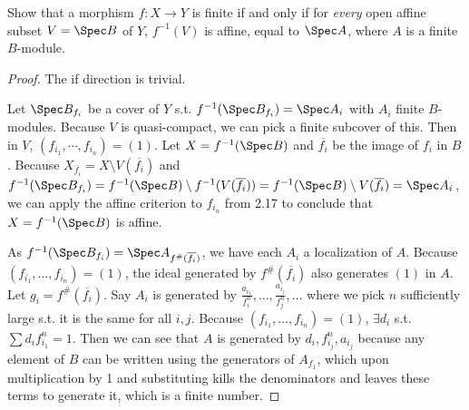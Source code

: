 \begin{exercise}%
	Show that a morphism $f: X\to Y $ is finite if and only if for \textit{every} open affine subset $V = \Spec B $ of $Y $, $f^{-1}(V) $ is affine, equal to $\Spec A $, where $A $ is a finite $B $-module.
\end{exercise}
\begin{proof}
	The if direction is trivial.

	Let $\Spec B_{f_i} $ be a cover of $Y $ s.t. $f^{-1}(\Spec B_{f_{i}}) = \Spec A_i $ with $A_i $ finite $B $-modules.
	Because $V $ is quasi-compact, we can pick a finite subcover of this.
	Then in $V $, $(f_{i_1},\cdots,f_{i_n}) = (1) $.
	Let $X = f^{-1}(\Spec B) $ and $\overline{f_i}  $ be the image of $f_i $ in $B $.
	Because $X_{\overline{f_i} } =  X \setminus V(\overline{f_i})$ and $f^{-1}(\Spec B_{f_{i}}) = f^{-1}(\Spec B) \setminus f^{-1}(V(\overline{f_i})) = f^{-1}(\Spec B) \setminus V(\overline{f_i}) = \Spec A_i   $, we can apply the affine criterion to $f_{i_n} $ from 2.17 to conclude that $X = f^{-1}(\Spec B)$ is affine.

	As $f^{-1}(\Spec B_{f_i}) = \Spec A_{f^\#(\overline{f_i}) } $, we have each $A_{i} $ a localization of $A $.
	Because $(f_{i_{1}}, \ldots , f_{i_n}) = (1) $, the ideal generated by $f^\#(\overline{f_i})  $ also generates $(1) $ in $A $.
	Let $g_i = f^\#(\overline{f_i})$.
	Say $A_i $ is generated by $\frac{a_{i_{1}}}{f_i^n},\ldots, \frac{a_{i_j}}{f_j^n}, \ldots $ where we pick $n $ sufficiently large s.t. it is the same for all $i,j $.
	Because $(f_{i_{1}}, \ldots , f_{i_n}) = (1)$, $\exists d_i $ s.t. $\sum d_i f_{i_{1}}^n = 1 $.
	Then we can see that $A $ is generated by $d_i, f_{i_j}^n, a_{i_j} $ because any element of $B $ can be written using the generators of $A_{f_1}$, which upon multiplication by 1 and substituting kills the denominators and leaves these terms to generate it, which is a finite number.
\end{proof}

